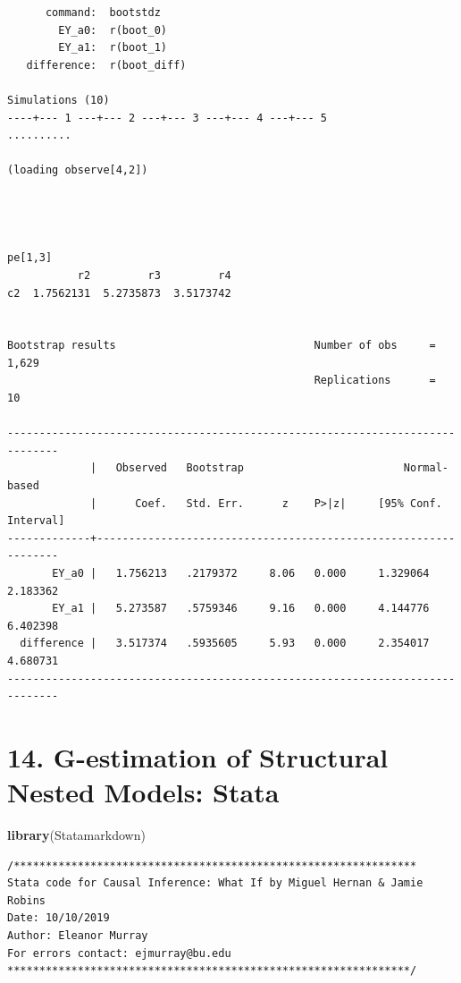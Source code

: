 \documentclass[
  10pt,
]{book}
\newenvironment{Shaded}{\begin{snugshade}}{\end{snugshade}}
\newcommand{\KeywordTok}[1]{\textcolor[rgb]{0.13,0.29,0.53}{\textbf{#1}}}
\newcommand{\NormalTok}[1]{#1}
\begin{document}
\begin{verbatim}
      command:  bootstdz
        EY_a0:  r(boot_0)
        EY_a1:  r(boot_1)
   difference:  r(boot_diff)

Simulations (10)
----+--- 1 ---+--- 2 ---+--- 3 ---+--- 4 ---+--- 5 
..........

(loading observe[4,2])




pe[1,3]
           r2         r3         r4
c2  1.7562131  5.2735873  3.5173742


Bootstrap results                               Number of obs     =      1,629
                                                Replications      =         10

------------------------------------------------------------------------------
             |   Observed   Bootstrap                         Normal-based
             |      Coef.   Std. Err.      z    P>|z|     [95% Conf. Interval]
-------------+----------------------------------------------------------------
       EY_a0 |   1.756213   .2179372     8.06   0.000     1.329064    2.183362
       EY_a1 |   5.273587   .5759346     9.16   0.000     4.144776    6.402398
  difference |   3.517374   .5935605     5.93   0.000     2.354017    4.680731
------------------------------------------------------------------------------
\end{verbatim}

\hypertarget{g-estimation-of-structural-nested-models-stata}{%
\chapter*{14. G-estimation of Structural Nested Models: Stata}\label{g-estimation-of-structural-nested-models-stata}}

\begin{Shaded}
\begin{Highlighting}[]
\KeywordTok{library}\NormalTok{(Statamarkdown)}
\end{Highlighting}
\end{Shaded}

\begin{verbatim}
/***************************************************************
Stata code for Causal Inference: What If by Miguel Hernan & Jamie Robins
Date: 10/10/2019
Author: Eleanor Murray 
For errors contact: ejmurray@bu.edu
***************************************************************/
\end{verbatim}
\end{document}
